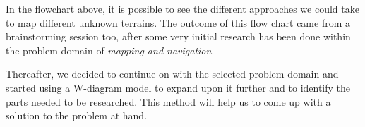 In the flowchart above, it is possible to see the different approaches we could take to map different unknown terrains. The outcome of this flow chart came from a brainstorming session too, after some very initial research has been done within the problem-domain of \textit{mapping and navigation}.

Thereafter, we decided to continue on with the selected problem-domain and started using a W-diagram model to expand upon it further and to identify the parts needed to be researched. This method will help us to come up with a solution to the problem at hand.
